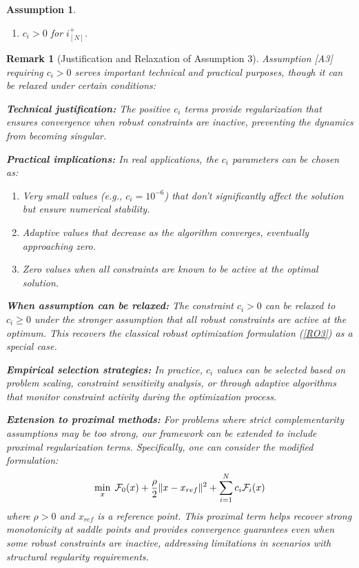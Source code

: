\documentclass[journal,twoside,web]{ieeecolor}
\newtheorem{assumption}[theorem]{Assumption}
\newtheorem{remark}{Remark}
\begin{document}
\begin{assumption} \label{assume_c>0}
\begin{enumerate}
\item [A3] $c_i > 0$ for $i^+_{[N]}$.
\end{enumerate}
\end{assumption}


{\color{blue} \begin{remark}[Justification and Relaxation of Assumption 3] \label{active_inactive_constraint_rem}
Assumption [A3] requiring $c_i > 0$ serves important technical and practical purposes, though it can be relaxed under certain conditions:

\textbf{Technical justification:} The positive $c_i$ terms provide regularization that ensures convergence when robust constraints are inactive, preventing the dynamics from becoming singular.

\textbf{Practical implications:} In real applications, the $c_i$ parameters can be chosen as:
\begin{enumerate}
\item Very small values (e.g., $c_i = 10^{-6}$) that don't significantly affect the solution but ensure numerical stability.
\item Adaptive values that decrease as the algorithm converges, eventually approaching zero.
\item Zero values when all constraints are known to be active at the optimal solution.
\end{enumerate}

\textbf{When assumption can be relaxed:} The constraint $c_i > 0$ can be relaxed to $c_i \geq 0$ under the stronger assumption that all robust constraints are active at the optimum. This recovers the classical robust optimization formulation (\ref{RO3}) as a special case.

\textbf{Empirical selection strategies:} In practice, $c_i$ values can be selected based on problem scaling, constraint sensitivity analysis, or through adaptive algorithms that monitor constraint activity during the optimization process.

\textbf{Extension to proximal methods:} For problems where strict complementarity assumptions may be too strong, our framework can be extended to include proximal regularization terms. Specifically, one can consider the modified formulation:
\begin{align}
\min_x \; {\cal F}_0(x) + \frac{\rho}{2}\|x - x_{ref}\|^2 + \sum_{i=1}^N c_i {\cal F}_i(x)
\end{align}
where $\rho > 0$ and $x_{ref}$ is a reference point. This proximal term helps recover strong monotonicity at saddle points and provides convergence guarantees even when some robust constraints are inactive, addressing limitations in scenarios with structural regularity requirements.
\end{remark}}
\end{document}

